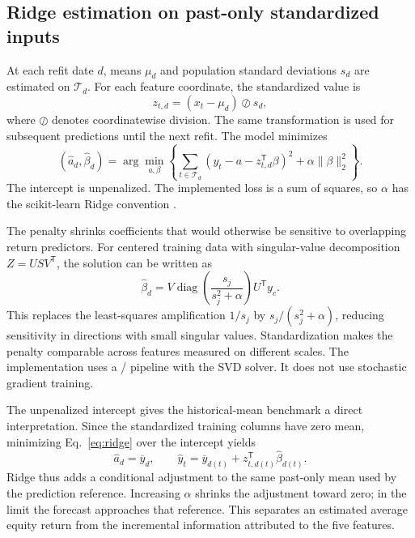 \subsection{Ridge estimation on past-only standardized inputs}
At each refit date $d$, means $\mu_d$ and population standard deviations $s_d$ are estimated on $\mathcal T_d$. For each feature coordinate, the standardized value is
\begin{equation}
z_{t,d}=(x_t-\mu_d)\oslash s_d,
\label{eq:standardize}
\end{equation}
where $\oslash$ denotes coordinatewise division. The same transformation is used for subsequent predictions until the next refit. The model minimizes
\begin{equation}
(\widehat a_d,\widehat\beta_d)
=\arg\min_{a,\beta}\left\{
\sum_{t\in\mathcal T_d}(y_t-a-z_{t,d}^{\mathsf T}\beta)^2
+\alpha\|\beta\|_2^2\right\}.
\label{eq:ridge}
\end{equation}
The intercept is unpenalized. The implemented loss is a sum of squares, so $\alpha$ has the scikit-learn Ridge convention \citep{sklearnridge}.

The penalty shrinks coefficients that would otherwise be sensitive to overlapping return predictors. For centered training data with singular-value decomposition $Z=USV^{\mathsf T}$, the solution can be written as
\begin{equation}
\widehat\beta_d=V\operatorname{diag}\!\left(\frac{s_j}{s_j^2+\alpha}\right)U^{\mathsf T}y_c.
\label{eq:svd}
\end{equation}
This replaces the least-squares amplification $1/s_j$ by $s_j/(s_j^2+\alpha)$, reducing sensitivity in directions with small singular values. Standardization makes the penalty comparable across features measured on different scales. The implementation uses a / pipeline with the SVD solver. It does not use stochastic gradient training.

The unpenalized intercept gives the historical-mean benchmark a direct interpretation. Since the standardized training columns have zero mean, minimizing Eq.~\eqref{eq:ridge} over the intercept yields
\begin{equation}
\widehat a_d=\overline y_d,\qquad
\widehat y_t=\overline y_{d(t)}+z_{t,d(t)}^{\mathsf T}\widehat\beta_{d(t)}.
\label{eq:meanadjustment}
\end{equation}
Ridge thus adds a conditional adjustment to the same past-only mean used by the prediction reference. Increasing $\alpha$ shrinks the adjustment toward zero; in the limit the forecast approaches that reference. This separates an estimated average equity return from the incremental information attributed to the five features.

